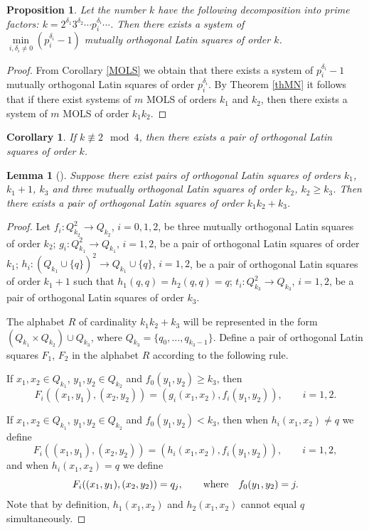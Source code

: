 \documentclass[11pt]{article}
\newtheorem{claim}{Proposition}[section]
\newtheorem{lemma}{Lemma}[section]
\newtheorem{corollary}{Corollary}[section]
\theoremstyle{definition}
\begin{document}
{{{\begin{claim}\label{clLS2}
Let the number $k$ have the following decomposition into prime factors:
$k=2^{\delta_1}3^{\delta_2}\cdots p_i^{\delta_i}\cdots$. Then
there exists a system of\\ $\min\limits_{i, \delta_i\neq 0}
(p_i^{\delta_i}-1)$ mutually orthogonal Latin squares
of order $k$.
\end{claim}
\begin{proof}
From Corollary \ref{MOLS} we obtain that there exists a system of
$p_i^{\delta_i}-1$ mutually orthogonal Latin squares
of order $p_i^{\delta_i}$. By Theorem \ref{thMN} it follows that if
there exist systems of $m$ MOLS
of orders $k_1$ and $k_2$, then there exists a system of $m$ MOLS of order $k_1k_2$.
\end{proof}

\begin{corollary}\label{corLS}
If $k\not\equiv 2\mod 4$, then there exists a pair of orthogonal Latin
squares of order $k$.
\end{corollary}

\begin{lemma}[\cite{DenesK}]\label{lemLS}
Suppose there exist pairs of orthogonal Latin squares of orders $k_1$,
$k_1+1$, $k_3$ and three mutually orthogonal Latin squares
of order $k_2$, $k_2\geq k_3$. Then there exists a pair of orthogonal
Latin squares of order $k_1k_2+k_3$.
\end{lemma}
\begin{proof}
Let $f_i:Q_{k_2}^2\rightarrow Q_{k_2}$, $i=0,1,2$, be three mutually
orthogonal Latin squares of order $k_2$;
$g_i:Q_{k_1}^2\rightarrow Q_{k_1}$, $i=1,2$, be a pair of orthogonal
Latin squares of order $k_1$;
$h_i:(Q_{k_1}\cup\{q\})^2\rightarrow Q_{k_1}\cup\{q\}$, $i=1,2$, be a
pair of orthogonal Latin squares of order $k_1+1$ such that
$h_1(q,q)=h_2(q,q)=q$; $t_i:Q_{k_3}^2\rightarrow Q_{k_3}$, $i=1,2$,
be a pair of orthogonal Latin squares of order $k_3$.

The alphabet $R$ of cardinality $k_1k_2+k_3$ will be represented in the form $(Q_{k_1}\times
Q_{k_2})\cup Q_{k_3}$, where $Q_{k_3}=\{q_0,\dots,q_{k_3-1}\}$.
Define a pair of orthogonal Latin squares $F_1$, $F_2$ in the
alphabet $R$ according to the following rule.

If $x_1,x_2\in Q_{k_1}$, $y_1,y_2\in Q_{k_2}$ and $f_0(y_1,y_2)\geq
k_3$, then $$F_i((x_1,y_1),(x_2,y_2))=(g_i(x_1,x_2),f_i(y_1,y_2)), \qquad
i=1,2.$$

If $x_1,x_2\in Q_{k_1}$, $y_1,y_2\in Q_{k_2}$ and $f_0(y_1,y_2)<
k_3$, then when $h_i(x_1,x_2)\neq q$ we define
$$F_i((x_1,y_1),(x_2,y_2))=(h_i(x_1,x_2),f_i(y_1,y_2)), \qquad i=1,2,$$ and
when $h_i(x_1,x_2)=q$ we define $$F_i((x_1,y_1),(x_2,y_2))= q_j, \qquad \mbox{\rm where}\quad
f_0(y_1,y_2)=j. $$ Note that by definition, $h_1(x_1,x_2)$ and
$h_2(x_1,x_2)$ cannot equal $q$ simultaneously.


\end{proof}}}}
\end{document}
